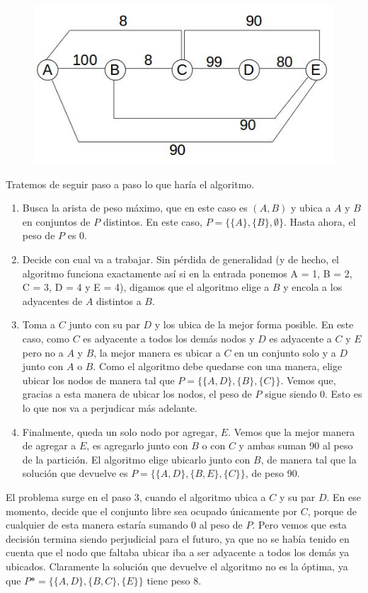 \documentclass[a4paper]{article}
\begin{document}
\begin{figure}[h]
\centering
\includegraphics[scale=0.5]{grafoCriterioMejorManera.jpg}
\end{figure}

Tratemos de seguir paso a paso lo que haría el algoritmo.
\begin{enumerate}
\item Busca la arista de peso máximo, que en este caso es $(A, B)$ y ubica a $A$ y $B$ en conjuntos de $P$ distintos. En este caso, $P = \{\{A\}, \{B\}, \emptyset\}$. Hasta ahora, el peso de $P$ es 0.
\item Decide con cual va a trabajar. Sin pérdida de generalidad (y de hecho, el algoritmo funciona exactamente así si en la entrada ponemos A = 1, B = 2, C = 3, D = 4 y E = 4), digamos que el algoritmo elige a $B$ y encola a los adyacentes de $A$ distintos a $B$.
\item Toma a $C$ junto con su par $D$ y los ubica de la mejor forma posible. En este caso, como $C$ es adyacente a todos los demás nodos y $D$ es adyacente a $C$ y $E$ pero no a $A$ y $B$, la mejor manera es ubicar a $C$ en un conjunto solo y a $D$ junto con $A$ o $B$. Como el algoritmo debe quedarse con una manera, elige ubicar los nodos de manera tal que $P = \{\{A, D\}, \{B\}, \{C\}\}$. Vemos que, gracias a esta manera de ubicar los nodos, el peso de $P$ sigue siendo 0. Esto es lo que nos va a perjudicar más adelante.
\item Finalmente, queda un solo nodo por agregar, $E$. Vemos que la mejor manera de agregar a $E$, es agregarlo junto con $B$ o con $C$ y ambas suman 90 al peso de la partición. El algoritmo elige ubicarlo junto con $B$, de manera tal que la solución que devuelve es $P = \{\{A, D\}, \{B, E\}, \{C\}\}$, de peso 90.
\end{enumerate}
El problema surge en el paso 3, cuando el algoritmo ubica a $C$ y su par $D$. En ese momento, decide que el conjunto libre sea ocupado únicamente por $C$, porque de cualquier de esta manera estaría sumando 0 al peso de $P$. Pero vemos que esta decisión termina siendo perjudicial para el futuro, ya que no se había tenido en cuenta que el nodo que faltaba ubicar iba a ser adyacente a todos los demás ya ubicados. Claramente la solución que devuelve el algoritmo no es la óptima, ya que $P* = \{\{A, D\}, \{B, C\}, \{E\}\}$ tiene peso 8.
\end{document}
